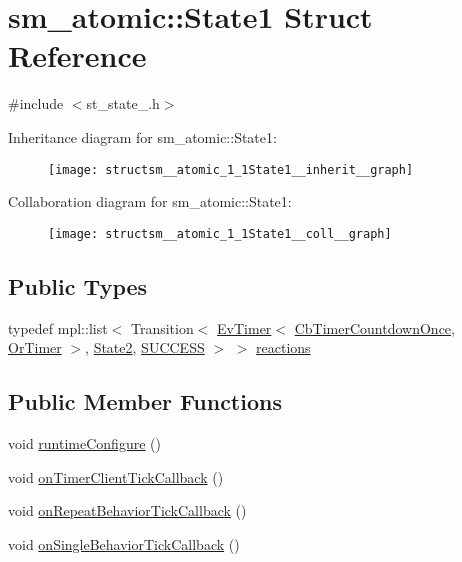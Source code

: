 \hypertarget{structsm__atomic_1_1State1}{}\section{sm\+\_\+atomic\+:\+:State1 Struct Reference}
\label{structsm__atomic_1_1State1}


{\ttfamily \#include $<$st\+\_\+state\+\_.\+h$>$}



Inheritance diagram for sm\+\_\+atomic\+:\+:State1\+:
\nopagebreak
\begin{figure}[H]
\begin{center}
\leavevmode
\texttt{[image: structsm\_\_atomic\_1\_1State1\_\_inherit\_\_graph]}
\end{center}
\end{figure}


Collaboration diagram for sm\+\_\+atomic\+:\+:State1\+:
\nopagebreak
\begin{figure}[H]
\begin{center}
\leavevmode
\texttt{[image: structsm\_\_atomic\_1\_1State1\_\_coll\_\_graph]}
\end{center}
\end{figure}
\subsection*{Public Types}
\begin{DoxyCompactItemize}
\item 
typedef mpl\+::list$<$ Transition$<$ \hyperlink{structcl__ros__timer__client_1_1EvTimer}{Ev\+Timer}$<$ \hyperlink{classcl__ros__timer__client_1_1CbTimerCountdownOnce}{Cb\+Timer\+Countdown\+Once}, \hyperlink{classsm__atomic_1_1OrTimer}{Or\+Timer} $>$, \hyperlink{structsm__atomic_1_1State2}{State2}, \hyperlink{structsmacc_1_1default__transition__tags_1_1SUCCESS}{S\+U\+C\+C\+E\+SS} $>$ $>$ \hyperlink{structsm__atomic_1_1State1_ab05a524c2d0d99c2ca7c4174d49de73c}{reactions}
\end{DoxyCompactItemize}
\subsection*{Public Member Functions}
\begin{DoxyCompactItemize}
\item 
void \hyperlink{structsm__atomic_1_1State1_a47c2e651bb707f14d9b32f92c44f8ebc}{runtime\+Configure} ()
\item 
void \hyperlink{structsm__atomic_1_1State1_adea28f0a0fcedb210a29656f53aeee09}{on\+Timer\+Client\+Tick\+Callback} ()
\item 
void \hyperlink{structsm__atomic_1_1State1_a9d2c943f02a8e0f1d7b86132ada1c6e0}{on\+Repeat\+Behavior\+Tick\+Callback} ()
\item 
void \hyperlink{structsm__atomic_1_1State1_a9cb95d91cf5a22f0d9d079dc04bf58aa}{on\+Single\+Behavior\+Tick\+Callback} ()
\end{DoxyCompactItemize}

